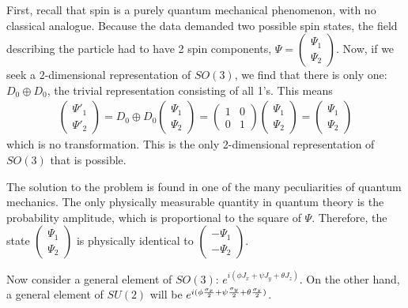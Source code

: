 \documentclass[12pt,epsf]{article}
\def\nolabel{\nonumber }
\def\nolabel{\nonumber }
\begin{document}
First, recall that spin is a purely quantum mechanical phenomenon, with
no classical analogue.	Because the data demanded two possible spin
states, the field describing the particle had to have 2 spin
components, $\Psi = \begin{pmatrix} \Psi_1 \\ \Psi_2 \end{pmatrix}$. 
Now, if we seek a 2-dimensional representation of $SO(3)$, we find
that there is only one: $D_0\oplus D_0$, the trivial representation
consisting of all 1's.  This means 
\begin{eqnarray}
\begin{pmatrix}
\Psi'_1 \\ \Psi'_2
\end{pmatrix} = D_0\oplus D_0 
\begin{pmatrix}
\Psi_1 \\ \Psi_2
\end{pmatrix} = 
\begin{pmatrix}
1 & 0 \\ 0 & 1
\end{pmatrix}
\begin{pmatrix}
\Psi_1 \\ \Psi_2
\end{pmatrix} = 
\begin{pmatrix}
\Psi_1 \\ \Psi_2
\end{pmatrix}\nolabel
\end{eqnarray}
which is no transformation.  This is the only 2-dimensional
representation of $SO(3)$ that is possible.  

The solution to the problem is found in one of the many peculiarities
of quantum mechanics.  The only physically measurable quantity in
quantum theory is the probability amplitude, which is proportional to
the square of $\Psi$.  Therefore, the state $\begin{pmatrix} \Psi_1 \\
\Psi_2 \end{pmatrix}$ is physically identical to $\begin{pmatrix}
-\Psi_1 \\ - \Psi_2\end{pmatrix}$.  

Now consider a general element of $SO(3)$: $e^{i(\phi J_x+\psi J_y +
\theta J_z)}$.	On the other hand, a general element of $SU(2)$ will be
$e^{i(\phi {\sigma_x \over 2}+ \psi {\sigma_y \over 2} + \theta
{\sigma_z \over 2})}$. 
\end{document}
